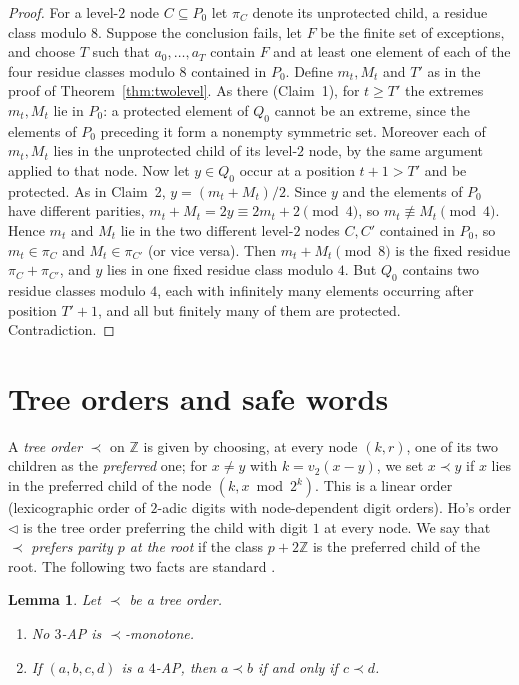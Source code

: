 \documentclass[11pt]{amsart}
\newtheorem{lemma}[theorem]{Lemma}
\theoremstyle{definition}
\theoremstyle{remark}
\newcommand{\Z}{\mathbb{Z}}
\begin{document}
\begin{proof}
For a level-$2$ node $C\subseteq P_0$ let $\pi_C$ denote its unprotected child, a residue class modulo $8$. Suppose the conclusion fails, let $F$ be the finite set of exceptions, and choose $T$ such that $a_0,\dots,a_T$ contain $F$ and at least one element of each of the four residue classes modulo $8$ contained in $P_0$. Define $m_t,M_t$ and $T'$ as in the proof of Theorem~\ref{thm:twolevel}. As there (Claim~1), for $t\ge T'$ the extremes $m_t,M_t$ lie in $P_0$: a protected element of $Q_0$ cannot be an extreme, since the elements of $P_0$ preceding it form a nonempty symmetric set. Moreover each of $m_t,M_t$ lies in the unprotected child of its level-$2$ node, by the same argument applied to that node. Now let $y\in Q_0$ occur at a position $t+1>T'$ and be protected. As in Claim~2, $y=(m_t+M_t)/2$. Since $y$ and the elements of $P_0$ have different parities, $m_t+M_t=2y\equiv 2m_t+2\pmod 4$, so $m_t\not\equiv M_t\pmod 4$. Hence $m_t$ and $M_t$ lie in the two different level-$2$ nodes $C,C'$ contained in $P_0$, so $m_t\in\pi_C$ and $M_t\in\pi_{C'}$ (or vice versa). Then $m_t+M_t\pmod 8$ is the fixed residue $\pi_C+\pi_{C'}$, and $y$ lies in one fixed residue class modulo $4$. But $Q_0$ contains two residue classes modulo $4$, each with infinitely many elements occurring after position $T'+1$, and all but finitely many of them are protected. Contradiction.
\end{proof}

\section{Tree orders and safe words}\label{sec:tree}

A \emph{tree order} $\prec$ on $\Z$ is given by choosing, at every node $(k,r)$, one of its two children as the \emph{preferred} one; for $x\ne y$ with $k=v_2(x-y)$, we set $x\prec y$ if $x$ lies in the preferred child of the node $(k,x\bmod 2^k)$. This is a linear order (lexicographic order of $2$-adic digits with node-dependent digit orders). Ho's order $\lhd$ \cite{Ho26} is the tree order preferring the child with digit $1$ at every node. We say that $\prec$ \emph{prefers parity $p$ at the root} if the class $p+2\Z$ is the preferred child of the root. The following two facts are standard \cite{ABJ,Ho26}.

\begin{lemma}\label{lem:tree}
Let $\prec$ be a tree order.
\begin{enumerate}[label=\textup{(T\arabic*)}]
\item No $3$-AP is $\prec$-monotone.
\item If $(a,b,c,d)$ is a $4$-AP, then $a\prec b$ if and only if $c\prec d$.
\end{enumerate}
\end{lemma}
\end{document}
